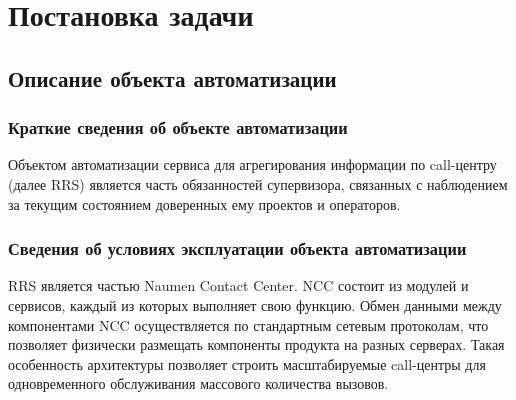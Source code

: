 \chapter{Постановка задачи}
\label{ch:requirements}
%
%

\section{Описание объекта автоматизации}

\subsection{Краткие сведения об объекте автоматизации}

Объектом автоматизации сервиса для агрегирования информации по call-центру (далее RRS) является часть обязанностей супервизора,
связанных с наблюдением за текущим состоянием доверенных ему проектов и операторов.

\subsection{Сведения об условиях эксплуатации объекта автоматизации}

RRS является частью Naumen Contact Center.
NCC состоит из модулей и сервисов, каждый из которых выполняет свою функцию.
Обмен данными между компонентами NCC осуществляется по стандартным сетевым протоколам,
что позволяет физически размещать компоненты продукта на разных серверах.
Такая особенность архитектуры позволяет строить масштабируемые call-центры
для одновременного обслуживания массового количества вызовов.

